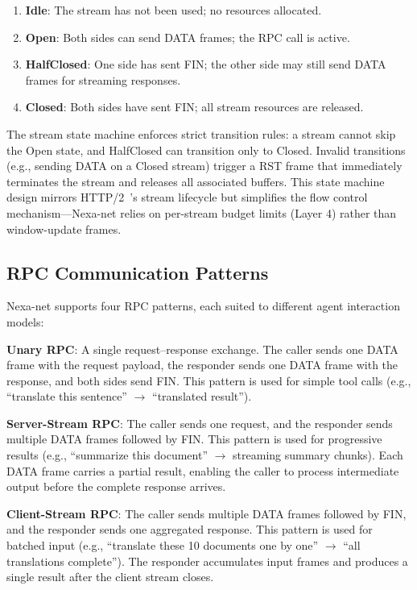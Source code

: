 \begin{enumerate}
  \item \textbf{Idle}: The stream has not been used; no resources allocated.
  \item \textbf{Open}: Both sides can send DATA frames; the RPC call is active.
  \item \textbf{HalfClosed}: One side has sent FIN; the other side may still send DATA frames for streaming responses.
  \item \textbf{Closed}: Both sides have sent FIN; all stream resources are released.
\end{enumerate}

The stream state machine enforces strict transition rules: a stream cannot skip the Open state, and HalfClosed can transition only to Closed. Invalid transitions (e.g., sending DATA on a Closed stream) trigger a RST frame that immediately terminates the stream and releases all associated buffers. This state machine design mirrors HTTP/2~\cite{rfc7540}'s stream lifecycle but simplifies the flow control mechanism---Nexa-net relies on per-stream budget limits (Layer 4) rather than window-update frames.

\subsection{RPC Communication Patterns}

Nexa-net supports four RPC patterns, each suited to different agent interaction models:

\textbf{Unary RPC}: A single request--response exchange. The caller sends one DATA frame with the request payload, the responder sends one DATA frame with the response, and both sides send FIN. This pattern is used for simple tool calls (e.g., ``translate this sentence'' $\rightarrow$ ``translated result'').

\textbf{Server-Stream RPC}: The caller sends one request, and the responder sends multiple DATA frames followed by FIN. This pattern is used for progressive results (e.g., ``summarize this document'' $\rightarrow$ streaming summary chunks). Each DATA frame carries a partial result, enabling the caller to process intermediate output before the complete response arrives.

\textbf{Client-Stream RPC}: The caller sends multiple DATA frames followed by FIN, and the responder sends one aggregated response. This pattern is used for batched input (e.g., ``translate these 10 documents one by one'' $\rightarrow$ ``all translations complete''). The responder accumulates input frames and produces a single result after the client stream closes.

